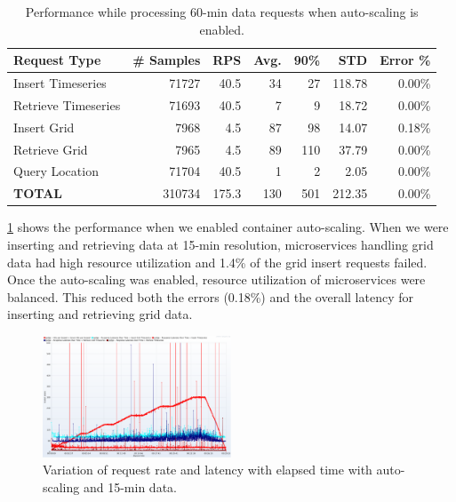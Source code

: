 \documentclass[conference]{IEEEtran}
\begin{document}
\begin{table}[tb!]
\caption{Performance while processing 60-min data requests when auto-scaling is enabled.}
\begin{center}
\begin{adjustbox}{width=0.45\textwidth}
\footnotesize
\begin{tabular}{|l|r|r|r|r|r|r|}
\hline
\textbf{Request Type} & \textbf{\# Samples} & \textbf{RPS} & \textbf{Avg.} & \textbf{90\%} & \textbf{STD} & \textbf{Error \%}\\ \hline
Insert Timeseries & 71727 & 40.5 & 34 & 27 & 118.78 & 0.00\% \\ \hline
Retrieve Timeseries & 71693 & 40.5 & 7 & 9 & 18.72 & 0.00\% \\ \hline
Insert Grid & 7968 & 4.5 & 87 & 98 & 14.07 & 0.18\% \\ \hline
Retrieve Grid & 7965 & 4.5 & 89 & 110 & 37.79 & 0.00\% \\ \hline
Query Location & 71704 & 40.5 & 1 & 2 & 2.05 & 0.00\% \\ \hline
\textbf{TOTAL} & 310734 & 175.3 & 130 & 501 & 212.35 & 0.00\% \\ \hline
\end{tabular}
\end{adjustbox}
\label{ptab:obs_all_auto_15_min_summary_throughput}
\end{center}
\end{table}

\cref{ptab:obs_all_auto_15_min_summary_throughput} shows the performance when we enabled container auto-scaling. When we were inserting and retrieving data at 15-min resolution, microservices handling grid data had high resource utilization and 1.4\% of the grid insert requests failed. Once the auto-scaling was enabled, resource utilization of microservices were balanced. This reduced both the errors (0.18\%) and the overall latency for inserting and retrieving grid data.

\begin{figure}[!tb]
\centerline{\includegraphics[width=0.5\textwidth]{results/obs/all_auto/obs_all_auto_15m_res_latencies_against_hits.png}}
\caption{Variation of request rate and latency with elapsed time with auto-scaling and 15-min data.}
\label{pfi:test_obs_auto_all_15_min_latency_vs_hits}
\end{figure}
\end{document}
